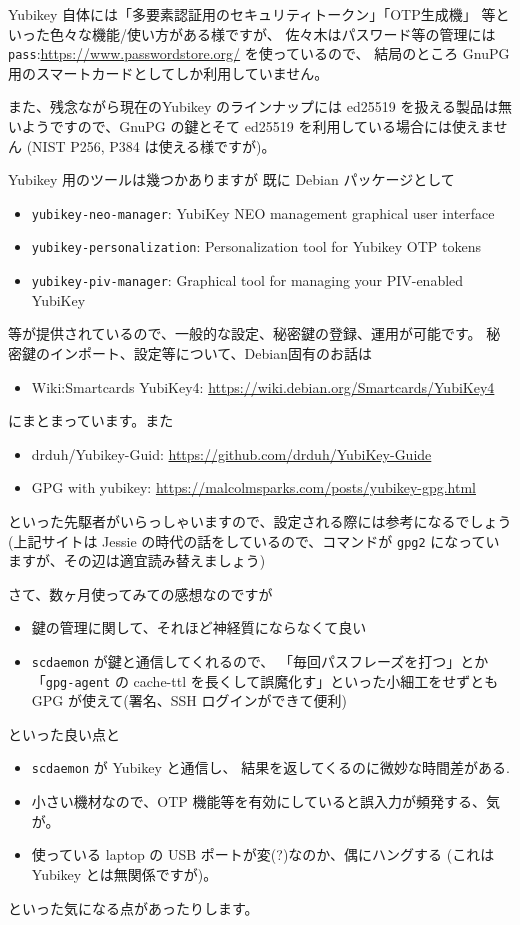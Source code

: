 \documentclass[mingoth,a4paper]{jsarticle}
\begin{document}
Yubikey 自体には「多要素認証用のセキュリティトークン」「OTP生成機」
等といった色々な機能/使い方がある様ですが、
佐々木はパスワード等の管理には
\texttt{pass}:\url{https://www.passwordstore.org/} を使っているので、
結局のところ GnuPG用のスマートカードとしてしか利用していません。

また、残念ながら現在のYubikey のラインナップには ed25519 を扱える製品は無
いようですので、GnuPG の鍵とそて ed25519 を利用している場合には使えません
(NIST P256, P384 は使える様ですが)。

Yubikey 用のツールは幾つかありますが
既に Debian パッケージとして
\begin{itemize}
\item %
  \texttt{yubikey-neo-manager}:
  YubiKey NEO management graphical user interface
\item %
  \texttt{yubikey-personalization}:
  Personalization tool for Yubikey OTP tokens
\item %
  \texttt{yubikey-piv-manager}:
  Graphical tool for managing your PIV-enabled YubiKey
\end{itemize}
等が提供されているので、一般的な設定、秘密鍵の登録、運用が可能です。
秘密鍵のインポート、設定等について、Debian固有のお話は
\begin{itemize}
\item %
  Wiki:Smartcards YubiKey4: \url{https://wiki.debian.org/Smartcards/YubiKey4}
\end{itemize}
にまとまっています。また
\begin{itemize}
\item %
  drduh/Yubikey-Guid: \url{https://github.com/drduh/YubiKey-Guide}
\item %
  GPG with yubikey: \url{https://malcolmsparks.com/posts/yubikey-gpg.html}
\end{itemize}
といった先駆者がいらっしゃいますので、設定される際には参考になるでしょう(上記サイトは Jessie の時代の話をしているので、コマンドが \texttt{gpg2} になっていますが、その辺は適宜読み替えましょう)

さて、数ヶ月使ってみての感想なのですが
\begin{itemize}
\item %
  鍵の管理に関して、それほど神経質にならなくて良い
\item
  \texttt{scdaemon} が鍵と通信してくれるので、
  「毎回パスフレーズを打つ」とか
  「\texttt{gpg-agent} の cache-ttl を長くして誤魔化す」といった小細工をせずとも
  GPG が使えて(署名、SSH ログインができて便利)
\end{itemize}
といった良い点と
\begin{itemize}
\item %
  \texttt{scdaemon} が Yubikey と通信し、
  結果を返してくるのに微妙な時間差がある.
\item %
  小さい機材なので、OTP 機能等を有効にしていると誤入力が頻発する、気が。
\item %
  使っている laptop の USB ポートが変(?)なのか、偶にハングする
  (これは Yubikey とは無関係ですが)。
\end{itemize}
といった気になる点があったりします。
\end{document}
